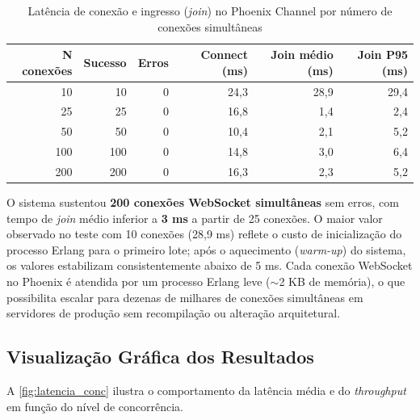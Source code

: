 \documentclass[
	12pt,
	openany,
	oneside,
	a4paper,
	english,
	brazil
]{abntex2}
\begin{document}
\begin{table}[htb]
\caption{\label{tab:websocket}Latência de conexão e ingresso (\textit{join}) no Phoenix Channel por número de conexões simultâneas}
\begin{tabular}{r|r|r|r|r|r}
  \toprule
  \textbf{N conexões} & \textbf{Sucesso} & \textbf{Erros} & \textbf{Connect (ms)} & \textbf{Join médio (ms)} & \textbf{Join P95 (ms)} \\
  \midrule
   10  & 10  & 0 & 24,3 & 28,9 & 29,4 \\
   25  & 25  & 0 & 16,8 &  1,4 &  2,4 \\
   50  & 50  & 0 & 10,4 &  2,1 &  5,2 \\
  100  & 100 & 0 & 14,8 &  3,0 &  6,4 \\
  200  & 200 & 0 & 16,3 &  2,3 &  5,2 \\
  \bottomrule
\end{tabular}
\end{table}

O sistema sustentou \textbf{200 conexões WebSocket simultâneas} sem erros, com tempo de \textit{join} médio inferior a \textbf{3 ms} a partir de 25 conexões. O maior valor observado no teste com 10 conexões (28,9 ms) reflete o custo de inicialização do processo Erlang para o primeiro lote; após o aquecimento (\textit{warm-up}) do sistema, os valores estabilizam consistentemente abaixo de 5 ms. Cada conexão WebSocket no Phoenix é atendida por um processo Erlang leve ($\sim$2 KB de memória), o que possibilita escalar para dezenas de milhares de conexões simultâneas em servidores de produção sem recompilação ou alteração arquitetural.

\subsection{Visualização Gráfica dos Resultados}

A \autoref{fig:latencia_conc} ilustra o comportamento da latência média e do \textit{throughput} em função do nível de concorrência.
\end{document}
